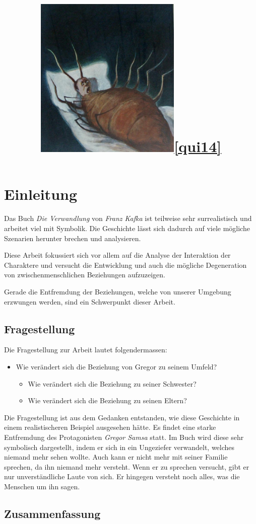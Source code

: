 \documentclass[12pt,a4paper,twoside,titlepage]{article}
\title{\includegraphics[width=7cm]{metamorphosis-kafka}\small\ref{qui14}\huge\\\titleText} %
\author{\authorText}
\date{\dateText}
\let\oldsection\section
\renewcommand\section{\clearpage\oldsection}
\begin{document}
	\maketitle
	
	\tableofcontents
	
	\section{Einleitung}
	
	
	Das Buch \textit{Die Verwandlung} von \textit{Franz Kafka} ist teilweise sehr surrealistisch und arbeitet viel mit Symbolik. Die Geschichte lässt sich dadurch auf viele mögliche Szenarien herunter brechen und analysieren.
	
	Diese Arbeit fokussiert sich vor allem auf die Analyse der Interaktion der Charaktere und versucht die Entwicklung und auch die mögliche Degeneration von zwischenmenschlichen Beziehungen aufzuzeigen.
	
	Gerade die Entfremdung der Beziehungen, welche von unserer Umgebung erzwungen werden, sind ein Schwerpunkt dieser Arbeit.
	
	
	\subsection{Fragestellung}
	Die Fragestellung zur Arbeit lautet folgendermassen:
	\begin{itemize}
		\item Wie verändert sich die Beziehung von Gregor zu seinem Umfeld?
		\begin{itemize}
			\item Wie verändert sich die Beziehung zu seiner Schwester?
			\item Wie verändert sich die Beziehung zu seinen Eltern?
		\end{itemize}
	\end{itemize}
	
	Die Fragestellung ist aus dem Gedanken entstanden, wie diese Geschichte in einem realistischeren Beispiel ausgesehen hätte. Es findet eine starke Entfremdung des Protagonisten \textit{Gregor Samsa} statt. Im Buch wird diese sehr symbolisch dargestellt, indem er sich in ein Ungeziefer verwandelt, welches niemand mehr sehen wollte. Auch kann er nicht mehr mit seiner Familie sprechen, da ihn niemand mehr versteht. Wenn er zu sprechen versucht, gibt er nur unverständliche Laute von sich. Er hingegen versteht noch alles, was die Menschen um ihn sagen.
	
	\subsection{Zusammenfassung}
	
\end{document}
